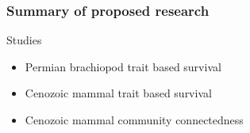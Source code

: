 \documentclass{beamer} \usepackage{amsmath,amsthm}
\begin{document}
\begin{frame}
  \frametitle{Summary of proposed research}

  \begin{alertblock}{Studies}
    \begin{itemize}
      \item Permian brachiopod trait based survival %
      \item Cenozoic mammal trait based survival %
      \item Cenozoic mammal community connectedness %
    \end{itemize}
  \end{alertblock}

\end{frame}
\end{document}
